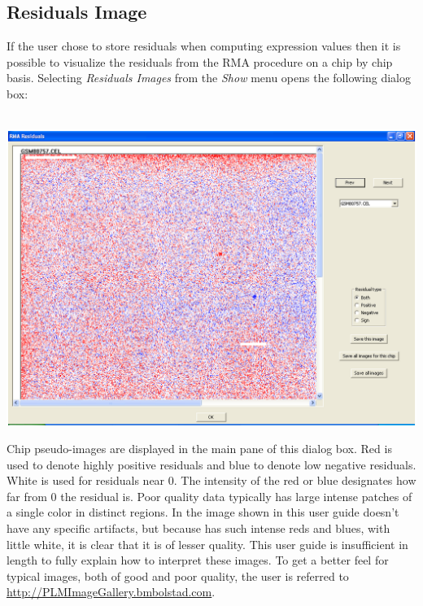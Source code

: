 \documentclass[11pt]{report}
\begin{document}
\subsection{Residuals Image} \label{sec:resids}
If the user chose to store residuals when computing expression values then it is possible to visualize the residuals from the RMA procedure on a chip by chip basis. Selecting {\it Residuals Images} from the {\it Show} menu opens the following dialog box: 
\\ \\
\begin{center}
\includegraphics[scale=0.40]{residualsimages}
\end{center}
Chip pseudo-images are displayed in the main pane of this dialog box. Red is used to denote highly positive residuals and blue to denote low negative residuals. White is used for residuals near 0. The intensity of the red or blue designates how far from 0 the residual is.  Poor quality data typically has large intense patches of a single color in distinct regions. In the image shown in this user guide doesn't have any specific artifacts, but because has such intense reds and blues, with little white, it is clear that it is of lesser quality. This user guide is insufficient in length to fully explain how to interpret these images. To get a better feel for typical images, both of good and poor quality, the user is referred to \url{http://PLMImageGallery.bmbolstad.com}.
\end{document}
